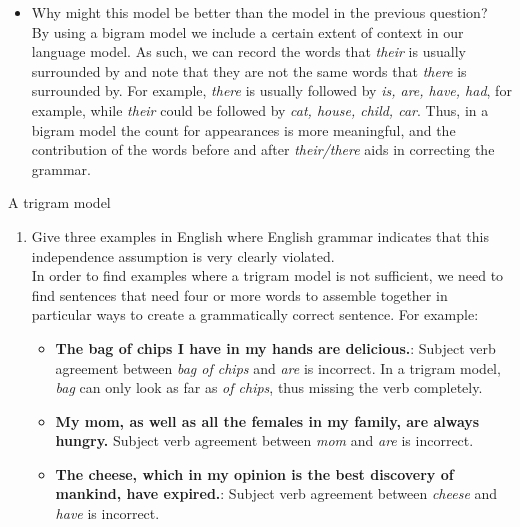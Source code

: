 \documentclass[12pt]{article}
\newenvironment{exercise}[2][Exercise]{\begin{trivlist}
\item[\hskip \labelsep {\bfseries #1}\hskip \labelsep {\bfseries #2.}]}{\end{trivlist}}
\begin{document}
\begin{exercise}{1. Spelling corrector}
\begin{enumerate}[label=(\alph*)]
\begin{itemize}
	\item Why might this model be better than the model in the previous question? \\ 
	
	By using a bigram model we include a certain extent of context in our language model. As such, we can record the words that \textit{their} is usually surrounded by and note that  they are not the same words that \textit{there} is surrounded by. For example, \textit{there} is usually followed by \textit{is, are, have, had}, for example, while \textit{their} could be followed by \textit{cat, house, child, car}. Thus, in a bigram model the count for appearances is more meaningful, and the contribution of the words before and after \textit{their/there} aids in correcting the grammar.
	\end{itemize}

\end{enumerate}
\end{exercise}
 
\begin{exercise}{2. Second order Markov assumption} A trigram model
\begin{enumerate}[label=(\alph*)]
	\item Give three examples in English where English grammar indicates that this independence assumption is very clearly violated. \\
	In order to find examples where a trigram model is not sufficient, we need to find sentences that need four or more words to assemble together in particular ways to create a grammatically correct sentence. For example:
	\begin{itemize}
	\item \textbf{The bag of chips I have in my hands are delicious.}: Subject verb agreement between \textit{bag of chips} and \textit{are} is incorrect. In a trigram model, \textit{bag} can only look as far as \textit{of chips}, thus missing the verb completely.
	\item \textbf{My mom, as well as all the females in my family, are always hungry.} Subject verb agreement between \textit{mom} and \textit{are} is incorrect.
	\item \textbf{The cheese, which in my opinion is the best discovery of mankind, have expired.}: Subject verb agreement between \textit{cheese} and \textit{have} is incorrect.
	\end{itemize}
	
\end{enumerate}
\end{exercise}
\end{document}
